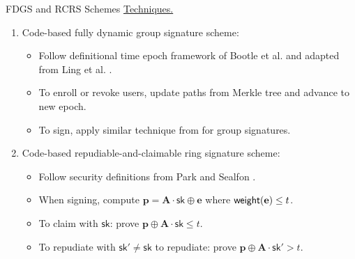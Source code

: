 \begin{frame}{FDGS and RCRS Schemes}
	\underline{Techniques.}\pause
	\begin{enumerate}
		\item Code-based fully dynamic group signature scheme:\pause
		\begin{itemize}
			\item Follow definitional time epoch framework of Bootle et al. \cite{BootleCCGG16} and adapted from Ling et al. \cite{LingNWX17}.\pause
			\item To enroll or revoke users, update paths from Merkle tree and advance to new epoch.\pause
			\item To sign, apply similar technique from \cite{NguyenTWZ19eprint} for group signatures.\pause
		\end{itemize}
		\item Code-based repudiable-and-claimable ring signature scheme:\pause
		\begin{itemize}
			\item Follow security definitions from Park and Sealfon \cite{ParkS19}.\pause
			\item When signing, compute $\mathbf{p} = \mathbf{A}\cdot \textsf{sk} \oplus \mathbf{e}$ where $\mathsf{weight}(\mathbf{e}) \leq t$.\pause
			\item To claim with $\textsf{sk}$: prove $\mathbf{p} \oplus \mathbf{A}\cdot\textsf{sk} \leq t$. \pause
			\item To repudiate with $\textsf{sk}'\not= \textsf{sk}$ to repudiate: prove $\mathbf{p} \oplus\mathbf{A}\cdot\textsf{sk}' > t$.
		\end{itemize}
	\end{enumerate}
\end{frame}